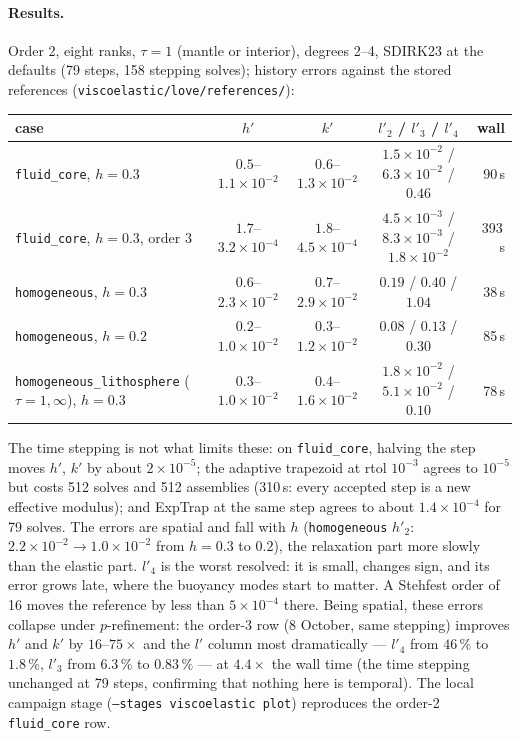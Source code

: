 \documentclass[11pt]{article}
\numberwithin{equation}{section}
\newcommand{\code}[1]{\texttt{#1}}
\begin{document}
\paragraph{Results.}
Order 2, eight ranks, $\tau=1$ (mantle or interior), degrees 2--4, SDIRK23
at the defaults (79 steps, 158 stepping solves); history errors against
the stored references (\code{viscoelastic/love/references/}):
\begin{center}
\small
\begin{tabular}{@{}P{3.6cm}cccr@{}}
\toprule
case & $h'$ & $k'$ & $l'_{2}$ / $l'_3$ / $l'_4$ & wall \\
\midrule
\code{fluid\_core}, $h=0.3$ & $0.5$--$1.1\times10^{-2}$ & $0.6$--$1.3\times10^{-2}$ & $1.5\times10^{-2}$ / $6.3\times10^{-2}$ / $0.46$ & 90\,s \\
\code{fluid\_core}, $h=0.3$, order 3 & $1.7$--$3.2\times10^{-4}$ & $1.8$--$4.5\times10^{-4}$ & $4.5\times10^{-3}$ / $8.3\times10^{-3}$ / $1.8\times10^{-2}$ & 393\,s \\
\code{homogeneous}, $h=0.3$ & $0.6$--$2.3\times10^{-2}$ & $0.7$--$2.9\times10^{-2}$ & $0.19$ / $0.40$ / $1.04$ & 38\,s \\
\code{homogeneous}, $h=0.2$ & $0.2$--$1.0\times10^{-2}$ & $0.3$--$1.2\times10^{-2}$ & $0.08$ / $0.13$ / $0.30$ & 85\,s \\
\code{homogeneous\_\allowbreak lithosphere} ($\tau=1,\infty$), $h=0.3$ & $0.3$--$1.0\times10^{-2}$ & $0.4$--$1.6\times10^{-2}$ & $1.8\times10^{-2}$ / $5.1\times10^{-2}$ / $0.10$ & 78\,s \\
\bottomrule
\end{tabular}
\end{center}
The time stepping is not what limits these: on \code{fluid\_core}, halving
the step moves $h'$, $k'$ by about $2\times10^{-5}$; the adaptive trapezoid
at rtol $10^{-3}$ agrees to $10^{-5}$ but costs 512 solves and 512
assemblies (310\,s: every accepted step is a new effective modulus); and
ExpTrap at the same step agrees to about $1.4\times10^{-4}$ for 79 solves.
The errors are spatial and fall with $h$ (\code{homogeneous} $h'_2$:
$2.2\times10^{-2}\to1.0\times10^{-2}$ from $h=0.3$ to $0.2$), the
relaxation part more slowly than the elastic part. $l'_4$ is the worst
resolved: it is small, changes sign, and its error grows late, where the
buoyancy modes start to matter. A Stehfest order of 16 moves the reference
by less than $5\times10^{-4}$ there. Being spatial, these errors collapse
under $p$-refinement: the order-3 row (8 October, same stepping) improves
$h'$ and $k'$ by $16$--$75\times$ and the $l'$ column most dramatically
--- $l'_4$ from $46\,\%$ to $1.8\,\%$, $l'_3$ from $6.3\,\%$ to
$0.83\,\%$ --- at $4.4\times$ the wall time (the time stepping unchanged
at 79 steps, confirming that nothing here is temporal). The local
campaign stage (\code{--stages viscoelastic plot}) reproduces the
order-2 \code{fluid\_core} row.
\end{document}

